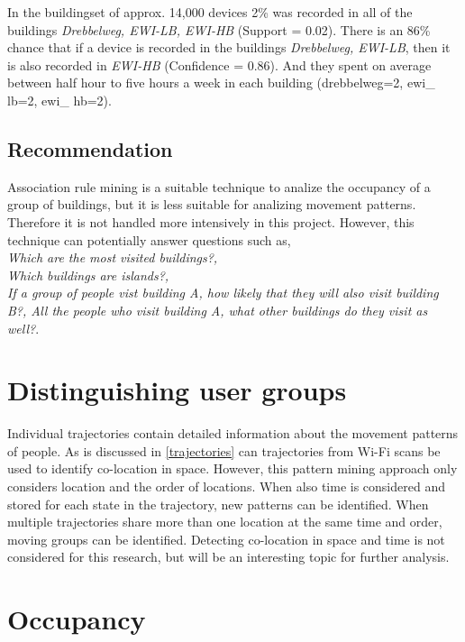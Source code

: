 In the buildingset of approx. 14,000 devices 2\% was recorded in all of the
buildings \textit{Drebbelweg, EWI-LB, EWI-HB} (Support = 0.02). There is an
86\% chance that if a device is recorded in the buildings \textit{Drebbelweg,
EWI-LB}, then it is also recorded in \textit{EWI-HB} (Confidence = 0.86). And
they spent on average between half hour to five hours a week in each building
(drebbelweg=2, ewi\_ lb=2, ewi\_ hb=2).

\subsection{Recommendation}
Association rule mining is a suitable technique to analize the occupancy of a
group of buildings, but it is less suitable for analizing movement patterns.
Therefore it is not handled more intensively in this project. However, this
technique can potentially answer questions such as,\\
\textit{Which are the most visited buildings?,\\
Which buildings are islands?,\\
If a group of people vist building A, how likely that they will also visit
building B?,
All the people who visit building A, what other buildings do they visit as
well?}.

\section{Distinguishing user groups}
Individual trajectories contain detailed information about the movement patterns of people. As is discussed in \autoref{trajectories} can trajectories from Wi-Fi scans be used to identify co-location in space. However, this pattern mining approach only considers location and the order of locations. When also time is considered and stored for each state in the trajectory, new patterns can be identified. When multiple trajectories share more than one location at the same time and order, moving groups can be identified. Detecting co-location in space and time is not considered for this research, but will be an interesting topic for further analysis.

\section{Occupancy}

